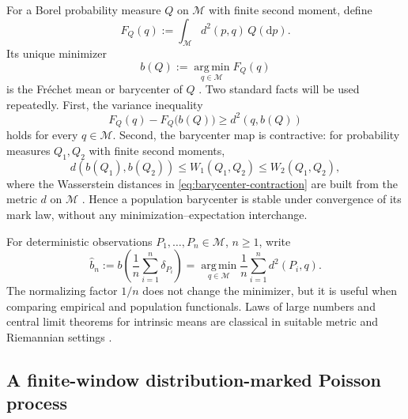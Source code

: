 \documentclass[11pt,a4paper]{article}
\theoremstyle{remark}
\newcommand{\M}{\mathcal M}
\newcommand{\argmin}{\operatorname*{arg\,min}}
\begin{document}
For a Borel probability measure \(Q\) on \(\M\) with finite second moment, define
\begin{equation}
\label{eq:frechet-functional}
 F_Q(q):=\int_{\M} d^2(p,q)\,Q(\mathrm dp).
\end{equation}
Its unique minimizer
\begin{equation}
\label{eq:barycenter-def}
 b(Q):=\argmin_{q\in\M}F_Q(q)
\end{equation}
is the Fr\'echet mean or barycenter of \(Q\) \cite{frechet1948,sturm2003}.  Two standard facts will be used repeatedly.  First, the variance inequality
\begin{equation}
\label{eq:variance-ineq}
 F_Q(q)-F_Q\bigl(b(Q)\bigr)\ge d^2\!\left(q,b(Q)\right)
\end{equation}
holds for every \(q\in\M\).  Second, the barycenter map is contractive: for probability measures \(Q_1,Q_2\) with finite second moments,
\begin{equation}
\label{eq:barycenter-contraction}
 d\!\left(b(Q_1),b(Q_2)\right)\le W_1(Q_1,Q_2)\le W_2(Q_1,Q_2),
\end{equation}
where the Wasserstein distances in \eqref{eq:barycenter-contraction} are built from the metric \(d\) on \(\M\) \cite{sturm2003}.  Hence a population barycenter is stable under convergence of its mark law, without any minimization--expectation interchange.

For deterministic observations \(P_1,\ldots,P_n\in\M\), \(n\ge1\), write
\begin{equation}
\label{eq:empirical-barycenter-fixed-n}
 \widehat b_n:=b\!\left(\frac1n\sum_{i=1}^n\delta_{P_i}\right)
 =\argmin_{q\in\M}\frac1n\sum_{i=1}^n d^2(P_i,q).
\end{equation}
The normalizing factor \(1/n\) does not change the minimizer, but it is useful when comparing empirical and population functionals.  Laws of large numbers and central limit theorems for intrinsic means are classical in suitable metric and Riemannian settings \cite{sturm2003,bhattacharya2003,bhattacharya2005,pennec2006}.

\subsection{A finite-window distribution-marked Poisson process}
\end{document}
